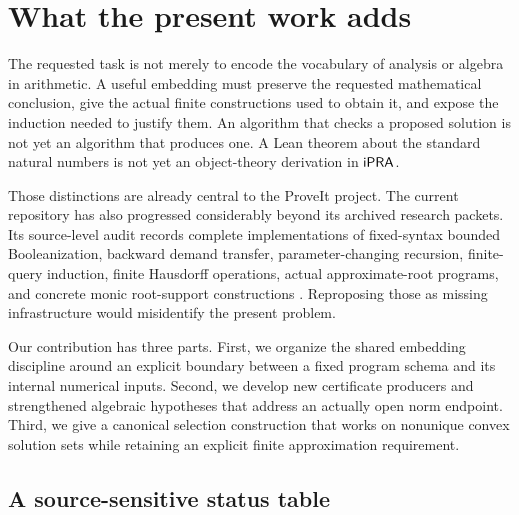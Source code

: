 \section{What the present work adds}
\label{sec:scope}

The requested task is not merely to encode the vocabulary of analysis or algebra in arithmetic. A useful embedding must preserve the requested mathematical conclusion, give the actual finite constructions used to obtain it, and expose the induction needed to justify them. An algorithm that checks a proposed solution is not yet an algorithm that produces one. A Lean theorem about the standard natural numbers is not yet an object-theory derivation in $\mathsf{iPRA}$.

Those distinctions are already central to the ProveIt project. The current repository has also progressed considerably beyond its archived research packets. Its source-level audit records complete implementations of fixed-syntax bounded Booleanization, backward demand transfer, parameter-changing recursion, finite-query induction, finite Hausdorff operations, actual approximate-root programs, and concrete monic root-support constructions \cite{repo-audit,repo-derivations}. Reproposing those as missing infrastructure would misidentify the present problem.

Our contribution has three parts. First, we organize the shared embedding discipline around an explicit boundary between a fixed program schema and its internal numerical inputs. Second, we develop new certificate producers and strengthened algebraic hypotheses that address an actually open norm endpoint. Third, we give a canonical selection construction that works on nonunique convex solution sets while retaining an explicit finite approximation requirement.

\subsection{A source-sensitive status table}

